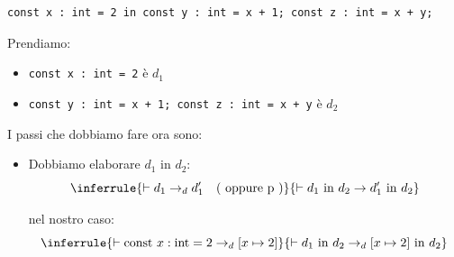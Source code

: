 \documentclass[a4paper]{article}
\begin{document}
\begin{Example}{}{} 
\begin{lstlisting}
const x : int = 2 in const y : int = x + 1; const z : int = x + y;
\end{lstlisting}
Prendiamo:
\begin{itemize}
  \item \texttt{const x : int = 2} è $d_1$ 
  \item \texttt{const y : int = x + 1; const z : int = x + y} è $d_2$
\end{itemize}
\noindent 
I passi che dobbiamo fare ora sono: 
\begin{itemize}
  \item Dobbiamo elaborare $d_1$ in $d_2$: 
  \[
    \inferrule
      {\vdash d_1 \to_d d_1' \quad \text{( oppure p )}}
      {\vdash d_1 \text{ in } d_2 \to d_1' \text{ in } d_2}
  \]
  
  nel nostro caso:
  \[
    \inferrule
      {\vdash \text{const } x : \text{int} = 2 \to_d [x \mapsto 2]}
      {\vdash d_1 \text{ in } d_2 \to_d [x \mapsto 2] \text{ in } d_2}
  \]
  

\end{itemize}
\end{Example}
\end{document}
